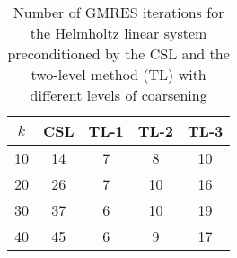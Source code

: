 \begin{table}[t]
\centering
\begin{tabular}{ccccc}
\hline
$k$ & CSL & TL-1 & TL-2 & TL-3 \\ \hline
10 & 14 & 7 & 8 & 10 \\
20 & 26 & 7 & 10 & 16 \\
30 & 37 & 6 & 10 & 19 \\
40 & 45 & 6 & 9 & 17 \\
\hline
\end{tabular}
\caption{Number of GMRES iterations for the Helmholtz linear system preconditioned by the  CSL and the two-level method (TL) with different levels of coarsening}
\label{table:gmres_csl_vs_adef_coarse_eps_10}
\end{table}
